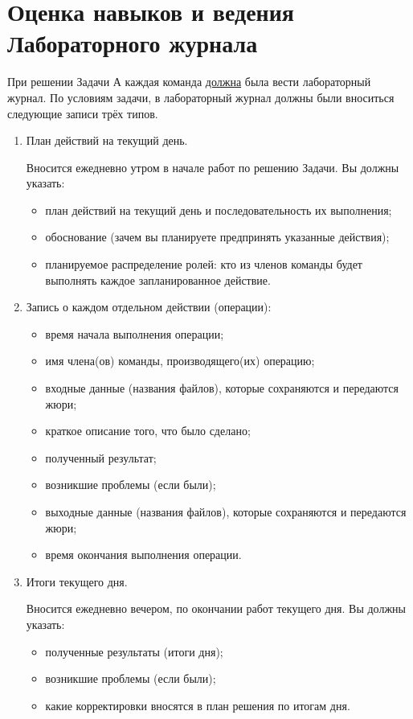 \section{Оценка навыков и ведения Лабораторного журнала}

При решении Задачи А каждая команда \underline{должна} была вести лабораторный журнал. По условиям задачи, в лабораторный журнал должны были вноситься следующие записи трёх типов.

\begin{enumerate}
    \item План действий на текущий день.
    
    Вносится ежедневно утром в начале работ по решению Задачи. Вы должны указать:
    \begin{itemize}
        \item план действий на текущий день и последовательность их выполнения;
        \item обоснование (зачем вы планируете предпринять указанные действия);
        \item планируемое распределение ролей: кто из членов команды будет выполнять каждое запланированное действие.
    \end{itemize}
    \item Запись о каждом отдельном действии (операции):
    \begin{itemize}
        \item время начала выполнения операции;
        \item имя члена(ов) команды, производящего(их) операцию;
        \item входные данные (названия файлов), которые сохраняются и передаются жюри;
        \item краткое описание того, что было сделано;
        \item полученный результат;
        \item возникшие проблемы (если были);
        \item выходные данные (названия файлов), которые сохраняются и передаются жюри;
        \item время окончания выполнения операции.
    \end{itemize}
    \item Итоги текущего дня.
    
    Вносится ежедневно вечером, по окончании работ текущего дня. Вы должны указать:
    \begin{itemize}
        \item полученные результаты (итоги дня);
        \item возникшие проблемы (если были);
        \item какие корректировки вносятся в план решения по итогам дня. 
    \end{itemize}
\end{enumerate}

